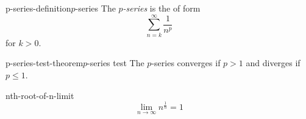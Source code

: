 \documentclass[preview]{standalone}
\begin{document}
\begin{snippetdefinition}{p-series-definition}{\(p\)-series}
    The \emph{\(p\)-series} is the \series of form
    \[\sum_{n=k}^\infty \frac{1}{n^p}\]
    for \(k > 0\).
\end{snippetdefinition}


\begin{snippettheorem}{p-series-test-theorem}{\(p\)-series test}
    The \(p\)-series converges if \(p > 1\) and diverges if \(p \leq 1\).
\end{snippettheorem}

\begin{snippetproposition}{nth-root-of-n-limit}{}
    \[ \lim_{n \to \infty} n^{\frac{1}{n}} = 1 \]
\end{snippetproposition}
\end{document}
